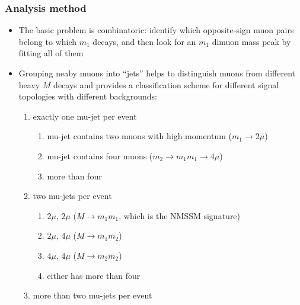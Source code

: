 \documentclass[compress]{beamer}
\begin{document}
\begin{frame}
\frametitle{Analysis method}
\begin{itemize}
\item The basic problem is combinatoric: identify which opposite-sign
  muon pairs belong to which $m_1$ decays, and then look for an $m_1$
  dimuon mass peak by fitting all of them
\item Grouping neaby muons into ``jets'' helps to distinguish muons
  from different heavy $M$ decays and provides a classification scheme
  for different signal topologies with different backgrounds:
\begin{enumerate}
\item exactly one mu-jet per event
\begin{enumerate}
\item mu-jet contains two muons with high momentum ($m_1 \to 2\mu$)
\item mu-jet contains four muons ($m_2 \to m_1 m_1 \to 4\mu$)
\item more than four
\end{enumerate}

\item two mu-jets per event
\begin{enumerate}
\item $2\mu$, $2\mu$ ($M \to m_1 m_1$, which is the NMSSM signature)
\item $2\mu$, $4\mu$ ($M \to m_1 m_2$)
\item $4\mu$, $4\mu$ ($M \to m_2 m_2$)
\item either has more than four
\end{enumerate}

\item more than two mu-jets per event
\end{enumerate}
\end{itemize}
\end{frame}
\end{document}
